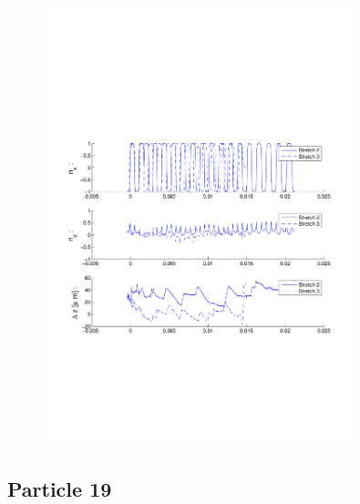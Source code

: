 \begin{figure}[ H]

\centering

\includegraphics[width=0.8\textwidth]{Images/Particle 18/Stretch2.pdf}

\end{figure}


\subsection{Particle 19}

